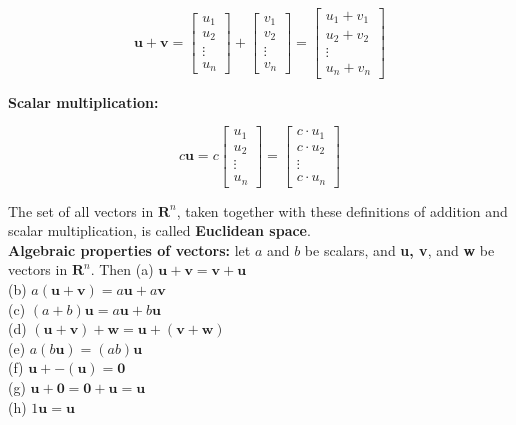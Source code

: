         \[
            \mathbf{u} + \mathbf{v} =
            \begin{bmatrix}
                u_1 \\
                u_2 \\
                \vdots \\
                u_n
            \end{bmatrix}
            +
            \begin{bmatrix}
                v_1 \\
                v_2 \\
                \vdots \\
                v_n
            \end{bmatrix}
            =
            \begin{bmatrix}
                u_1 + v_1 \\
                u_2 + v_2 \\
                \vdots \\
                u_n + v_n
            \end{bmatrix}
        \]

        \textbf{Scalar multiplication:}

        \[
            c\mathbf{u} = c
            \begin{bmatrix}
                u_1 \\
                u_2 \\
                \vdots \\
                u_n
            \end{bmatrix}
            =
            \begin{bmatrix}
                c\cdot u_1 \\
                c\cdot u_2 \\
                \vdots \\
                c\cdot u_n
            \end{bmatrix}
        \]

        The set of all vectors in $\mathbf{R}^n$, taken together with these definitions of addition and scalar multiplication, is called \textbf{Euclidean space}. \\

        \textbf{Algebraic properties of vectors:} let $a$ and $b$ be scalars, and \textbf{u, v}, and \textbf{w} be vectors in $\mathbf{R}^n$. Then
        (a) $\mathbf{u+v=v+u}$ \\
        (b) $a(\mathbf{u+v})=a\mathbf{u} + a\mathbf{v}$ \\
        (c) $(a+b)\mathbf{u}=a\mathbf{u} + b\mathbf{u}$ \\
        (d) $(\mathbf{u+v}) + \mathbf{w} = \mathbf{u} + (\mathbf{v+w})$ \\
        (e) $a(b\mathbf{u}) = (ab)\mathbf{u}$ \\
        (f) $\mathbf{u} + -\mathbf{(u)}=\mathbf{0}$ \\
        (g) $\mathbf{u+0=0+u=u}$ \\
        (h) $1\mathbf{u=u}$ \\

